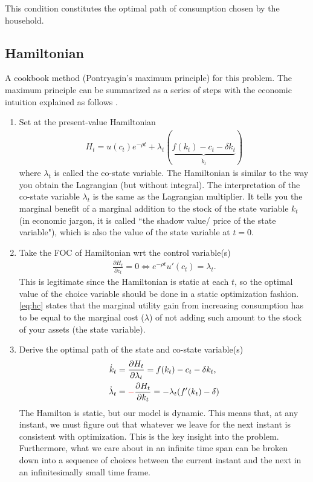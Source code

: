 \documentclass[11pt,a4paper]{book}
\newcommand{\red}[1]{\textcolor{red}{#1}}
\theoremstyle{definition}\newtheorem{definition}{Definition}
\theoremstyle{definition}\newtheorem{fact}{Fact}
\theoremstyle{definition}\newtheorem{remark}{Remark}
\theoremstyle{definition}\newtheorem{ex}{Ex.}
\theoremstyle{definition}\newtheorem{project}{Project}
\theoremstyle{definition}\newtheorem{problem}{Problem}
\theoremstyle{definition}\newtheorem{example}{Example}
\numberwithin{theorem}{section}
\numberwithin{corollary}{chapter}
\numberwithin{assumption}{chapter}
\numberwithin{definition}{chapter}
\numberwithin{prop}{chapter}
\numberwithin{notation}{chapter}
\numberwithin{problem}{chapter}
\numberwithin{example}{chapter}
\numberwithin{fact}{chapter}
\numberwithin{ex}{chapter}
\begin{document}
This condition constitutes the optimal path of consumption chosen by the household.

	\subsection{Hamiltonian}
	A cookbook method (Pontryagin’s maximum principle) for this problem.
		The maximum principle can be summarized as a series of steps with the economic intuition explained as follows \citep{campante2021advanced}.
	\begin{enumerate}
		\item Set at the present-value Hamiltonian
		\begin{align}
			H_t = u(c_t)e^{-\rho t} + \lambda_t ( \underbrace{f(k_t) - c_t - \delta k_t}_{\dot{k}_t})
		\end{align}
		where $\lambda_t$ is called the co-state variable. The Hamiltonian is similar to the way you obtain the Lagrangian (but without integral). The interpretation of the co-state variable $\lambda_t$ is the same as the Lagrangian multiplier. It tells you the marginal benefit of a marginal addition to the stock of the state variable $k_t$ (in economic jargon, it is called ``the shadow value/ price of the state variable"), which is also the value of the state variable at $t=0$.
				
		\item Take the FOC of Hamiltonian wrt the control variable(s)
		\begin{align}
			\frac{\partial H_t}{\partial c_t} = 0 \Leftrightarrow e^{-\rho t} u'(c_t) = \lambda_t. \label{eq:hc}
		\end{align}
		This is legitimate since the Hamiltonian is static at each $t$, so the optimal value of the choice variable should be done in a static optimization fashion. \eqref{eq:hc} states that the marginal utility gain from increasing consumption has to be equal to the marginal cost ($\lambda$) of not adding such amount to the stock of your assets (the state variable).
		
		\item Derive the optimal path of the state and co-state variable(s)
		\begin{align}
			\dot{k}_t &= \frac{\partial H_t}{\partial \lambda_t} = f(k_t) - c_t - \delta k_t, \label{eq:kdot} \\
			\dot{\lambda}_t &= \red{-} \frac{\partial H_t}{\partial k_t} = - \lambda_t (f'(k_t) - \delta) \label{eq:costate}
		\end{align}
		The Hamilton is static, but our model is dynamic. This means that, at any instant, we must figure out that whatever we leave for the next instant is consistent with optimization. This is the key insight into the problem. Furthermore, what we care about in an infinite time span can be broken down into a sequence of choices between the current instant and the next in an infinitesimally small time frame.
		

\end{enumerate}
\end{document}

